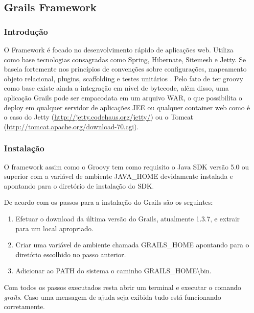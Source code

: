 \documentclass[12pt]{article}
\begin{document}
\subsection{Grails Framework}

\subsubsection{Introdução}

    O Framework é focado no desenvolvimento rápido de aplicações web. Utiliza como
    base tecnologias consagradas como Spring, Hibernate, Sitemesh e Jetty. Se baseia 
    fortemente nos princípios de convenções sobre configurações, mapeamento objeto
    relacional, plugins, scaffolding e testes unitários \cite{beginingGroovy:2008}.
    Pelo fato de ter groovy como base existe ainda a integração em nível de bytecode,
    além disso, uma aplicação Grails pode ser empacodata em um arquivo WAR, o que 
    possibilita o deploy em qualquer servidor de aplicações JEE ou qualquer
    container web como é o caso do Jetty (\url{http://jetty.codehaus.org/jetty/})
    ou o Tomcat (\url{http://tomcat.apache.org/download-70.cgi}).
    
\subsubsection{Instalação}
    
    O framework assim como o Groovy tem como requisito o Java SDK versão 5.0 ou 
    superior com a variável de ambiente JAVA\_HOME devidamente instalada e apontando
    para o diretório de instalação do SDK. 
    
    De acordo com \cite{grails} os passos para a instalação do Grails são os seguintes:
    \begin{enumerate}
        \item Efetuar o download da última versão do Grails, atualmente 1.3.7, e extrair
              para um local apropriado.
        \item Criar uma variável de ambiente chamada GRAILS\_HOME apontando para
              o diretório escolhido no passo anterior.
        \item Adicionar ao PATH do sistema o caminho GRAILS\_HOME\textbackslash{}bin.
    \end{enumerate}

    Com todos os passos executados resta abrir um terminal e executar o comando 
    \emph{grails}. Caso uma mensagem de ajuda seja exibida tudo está funcionando corretamente. 
\end{document}
